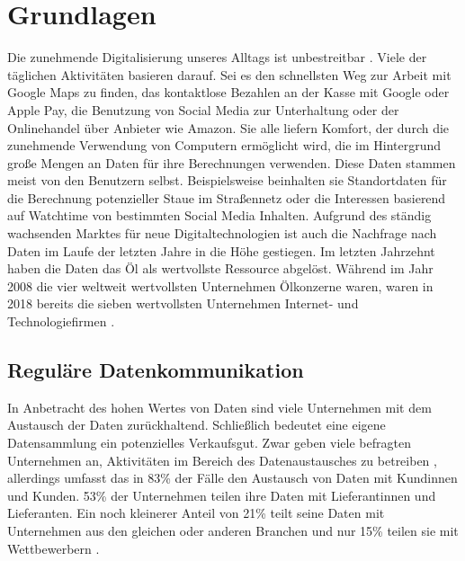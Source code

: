 \documentclass[
	fontsize=11pt,
	headings=small,
	parskip=half,           %
	bibliography=totoc,
	numbers=noenddot,       %
	open=any,               %
]{scrreprt}
\begin{document}
\chapter{Grundlagen}
\label{chap:basics}
Die zunehmende Digitalisierung unseres Alltags ist unbestreitbar \cite{dt-digitalisierung-stat}. Viele der täglichen Aktivitäten basieren darauf. Sei es den schnellsten Weg zur Arbeit mit Google Maps zu finden, das kontaktlose Bezahlen an der Kasse mit Google oder Apple Pay, die Benutzung von Social Media zur Unterhaltung oder der Onlinehandel über Anbieter wie Amazon. Sie alle liefern Komfort, der durch die zunehmende Verwendung von Computern ermöglicht wird, die im Hintergrund große Mengen an Daten für ihre Berechnungen verwenden. Diese Daten stammen meist von den Benutzern selbst. Beispielsweise beinhalten sie Standortdaten für die Berechnung potenzieller Staue im Straßennetz \cite{dt-googlemaps-staus} oder die Interessen basierend auf Watchtime von bestimmten Social Media Inhalten. Aufgrund des ständig wachsenden Marktes für neue Digitaltechnologien ist auch die Nachfrage nach Daten im Laufe der letzten Jahre in die Höhe gestiegen. Im letzten Jahrzehnt haben die Daten das Öl als wertvollste Ressource abgelöst. Während im Jahr 2008 die vier weltweit wertvollsten Unternehmen Ölkonzerne waren, waren in 2018 bereits die sieben wertvollsten Unternehmen Internet- und Technologiefirmen \cite{dt-falck2020rohstoff}. 

\section{Reguläre Datenkommunikation}
In Anbetracht des hohen Wertes von Daten sind viele Unternehmen mit dem Austausch der Daten zurückhaltend. Schließlich bedeutet eine eigene Datensammlung ein potenzielles Verkaufsgut. Zwar geben viele befragten Unternehmen an, Aktivitäten im Bereich des Datenaustausches zu betreiben \cite{dt-fedkenhauer2017datenaustausch}, allerdings umfasst das in 83\% der Fälle den Austausch von Daten mit Kundinnen und Kunden. 53\% der Unternehmen teilen ihre Daten mit Lieferantinnen und Lieferanten. Ein noch kleinerer Anteil von 21\% teilt seine Daten mit Unternehmen aus den gleichen oder anderen Branchen und nur 15\% teilen sie mit Wettbewerbern \cite{dt-fedkenhauer2017datenaustausch}.
\end{document}
